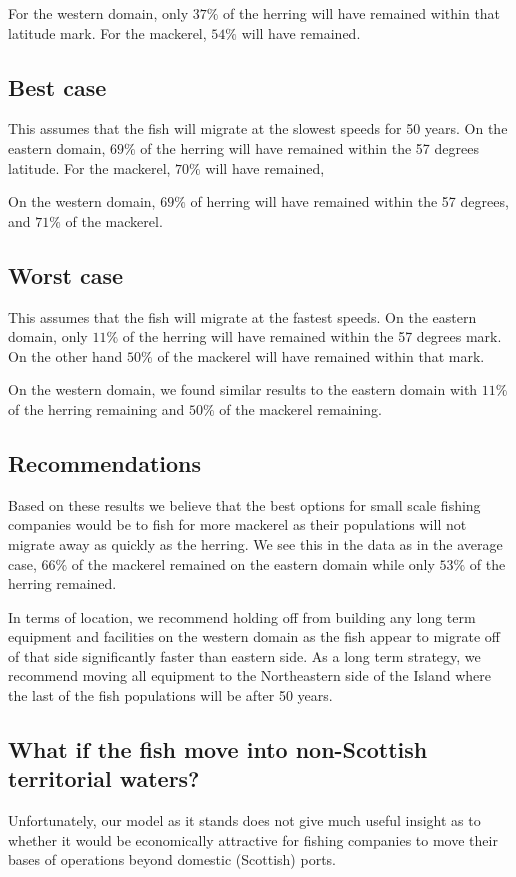 \documentclass[12pt]{article}
\begin{document}
For the western domain, only $37\%$ of the herring will have remained within that latitude mark. For the mackerel, $54\%$ will have remained.

\subsection{Best case}
This assumes that the fish will migrate at the slowest speeds for 50 years. On the eastern domain, $69\%$ of the herring will have remained within the 57 degrees latitude. For the mackerel, $70\%$ will have remained,

On the western domain, $69\%$ of herring will have remained within the 57 degrees, and $71\%$ of the mackerel.  

\subsection{Worst case}
This assumes that the fish will migrate at the fastest speeds. On the eastern domain, only $11\%$ of the herring will have remained within the 57 degrees mark. On the other hand $50\%$ of the mackerel will have remained within that mark.

On the western domain, we found similar results to the eastern domain with $11\%$ of the herring remaining and $50\%$ of the mackerel remaining.

\subsection{Recommendations}
Based on these results we believe that the best options for small scale fishing companies would be to fish for more mackerel as their populations will not migrate away as quickly as the herring. We see this in the data as in the average case, $66\%$ of the mackerel remained on the eastern domain while only $53\%$ of the herring remained. 

In terms of location, we recommend holding off from building any long term equipment and facilities on the western domain as the fish appear to migrate off of that side significantly faster than eastern side. As a long term strategy, we recommend moving all equipment to the Northeastern side of the Island where the last of the fish populations will be after 50 years.

\subsection{What if the fish move into non-Scottish territorial waters?}
Unfortunately, our model as it stands does not give much useful insight as to whether it would be economically attractive for fishing companies to move their bases of operations beyond domestic (Scottish) ports. 
\end{document}
